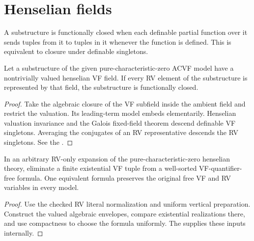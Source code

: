 \section{Henselian fields}

\begin{definition}
\label{def:functional-closure}
\leanok
A substructure is functionally closed when each definable partial
function over it sends tuples from it to tuples in it whenever the
function is defined. This is equivalent to closure under definable
singletons.
\end{definition}

\begin{lemma}
\label{lem:henselian-closure}
\leanok
Let a substructure of the given pure-characteristic-zero ACVF model
have a nontrivially valued henselian VF field. If every RV element of
the substructure is represented by that field, the substructure is
functionally closed.
\end{lemma}
\begin{proof}
\leanok
{}
Take the algebraic closure of the VF subfield inside the ambient
field and restrict the valuation. Its leading-term model embeds
elementarily. Henselian valuation invariance and the Galois fixed-field
theorem descend definable VF singletons. Averaging the conjugates of
an RV representative descends the RV singletons. See the
.
\end{proof}

\begin{lemma}
\label{lem:henselian-one-step}
\leanok
In an arbitrary RV-only expansion of the pure-characteristic-zero
henselian theory, eliminate a finite existential VF tuple from a
well-sorted VF-quantifier-free formula. One equivalent formula
preserves the original free VF and RV variables in every model.
\end{lemma}
\begin{proof}
\leanok
{}
Use the checked RV literal normalization and uniform vertical
preparation. Construct the valued algebraic envelopes, compare
existential realizations there, and use compactness to choose the
formula uniformly. The 
supplies these inputs internally.
\end{proof}

